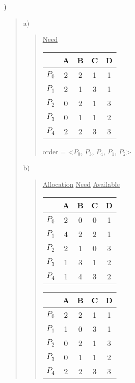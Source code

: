 \documentclass[11pt]{article}
\newenvironment{subquestion}[1]{#1) \begin{quote}}{\end{quote}}
\begin{document}
  \begin{subquestion}{7.23}
    \begin{subquestion}{a}
      \begin{center}
        \vspace{-.2cm}
        \underline{Need}\\
        \vspace{.2cm}
        \begin{tabular}{l | c | c | c | c|}
                & A & B & C & D\\\hline
          $P_0$ & 2 & 2 & 1 & 1\\
          $P_1$ & 2 & 1 & 3 & 1\\
          $P_2$ & 0 & 2 & 1 & 3\\
          $P_3$ & 0 & 1 & 1 & 2\\
          $P_4$ & 2 & 2 & 3 & 3
        \end{tabular}
      \end{center}
      order = \textless$P_0$, $P_3$, $P_4$, $P_1$, $P_2$\textgreater
    \end{subquestion}
    \begin{subquestion}{b}
      \begin{table}[h]
        \hspace{.8cm}\underline{Allocation} \hfill \underline{Need} \hfill \underline{Available}\hspace{1cm}\null\\
        \vspace{.2cm}
        \begin{tabular}[t]{l | c | c | c | c|}
                & A & B & C & D\\\hline
          $P_0$ & 2 & 0 & 0 & 1\\
          $P_1$ & 4 & 2 & 2 & 1\\
          $P_2$ & 2 & 1 & 0 & 3\\
          $P_3$ & 1 & 3 & 1 & 2\\
          $P_4$ & 1 & 4 & 3 & 2
        \end{tabular}
        \hfill
        \begin{tabular}[t]{l | c | c | c | c|}
                & A & B & C & D\\\hline
          $P_0$ & 2 & 2 & 1 & 1\\
          $P_1$ & 1 & 0 & 3 & 1\\
          $P_2$ & 0 & 2 & 1 & 3\\
          $P_3$ & 0 & 1 & 1 & 2\\
          $P_4$ & 2 & 2 & 3 & 3

\end{tabular}
\end{table}
\end{subquestion}
\end{subquestion}
\end{document}
